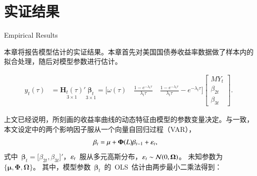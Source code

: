 
\chapter{实证结果}{Empirical Results}
\label{chap04}

本章将报告模型估计的实证结果。本章首先对美国国债券收益率数据做了样本内的拟合处理，随后对模型参数进行估计。

  \begin{align}
   y_{t}(\tau) & = \underset{3\times1} {\mathbf{H}_{t}(\tau)}
   {}'{}  \underset{3\times1} {\mathbf{\beta}_t}
   = \big[\omega(\tau)  \quad
   \frac{1-e^{-\lambda_{t} \tau}} {\lambda_{t} \tau} \quad
   \frac{1-e^{-\lambda_{t} \tau}} {\lambda_{t} \tau} - e^{-\lambda_{t} \tau} \big]
   \begin{bmatrix}
     MY_t \\
     \beta_{2t}\\
     \beta_{3t}
   \end{bmatrix}.
 \end{align}

    上文已经说明，\dns 所刻画的收益率曲线的动态特征由模型的参数变量决定。与一致，本文设定中的两个影响因子服从一个向量自回归过程（VAR），
 \begin{align}\label{var2}
   \mathbf{\beta}_t &=\mathbf{\mu}+\mathbf{\Phi}(L)\mathbf{\beta}_{t-1} + \mathbf{\varepsilon}_t,
 \end{align}
 式中~$\mathbf{\beta}_t = \big[\beta_{2t}, \beta_{3t}\big]'$，$\mathbf{\varepsilon}_t$~服从多元高斯分布，$\mathbf{\varepsilon}_t \sim \mathcal{N}(0,\mathbf{\Omega})$。 未知参数为~$\{\mathbf{\mu}, \mathbf{\Phi}, \mathbf{\Omega}\}$。 其中，模型参数~$\mathbf{\beta}_t$~的~OLS~估计由两步最小二乘法得到：
 
